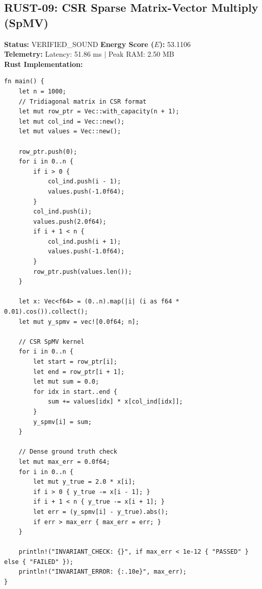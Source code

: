 \documentclass[11pt, a4paper]{article}
\begin{document}
\subsection{RUST-09: CSR Sparse Matrix-Vector Multiply (SpMV)}
\textbf{Status:} VERIFIED\_SOUND \hfill \textbf{Energy Score ($E$):} 53.1106\\
\textbf{Telemetry:} Latency: 51.86 ms $|$ Peak RAM: 2.50 MB\\
\textbf{Rust Implementation:}
\begin{verbatim}
fn main() {
    let n = 1000;
    // Tridiagonal matrix in CSR format
    let mut row_ptr = Vec::with_capacity(n + 1);
    let mut col_ind = Vec::new();
    let mut values = Vec::new();

    row_ptr.push(0);
    for i in 0..n {
        if i > 0 {
            col_ind.push(i - 1);
            values.push(-1.0f64);
        }
        col_ind.push(i);
        values.push(2.0f64);
        if i + 1 < n {
            col_ind.push(i + 1);
            values.push(-1.0f64);
        }
        row_ptr.push(values.len());
    }

    let x: Vec<f64> = (0..n).map(|i| (i as f64 * 0.01).cos()).collect();
    let mut y_spmv = vec![0.0f64; n];

    // CSR SpMV kernel
    for i in 0..n {
        let start = row_ptr[i];
        let end = row_ptr[i + 1];
        let mut sum = 0.0;
        for idx in start..end {
            sum += values[idx] * x[col_ind[idx]];
        }
        y_spmv[i] = sum;
    }

    // Dense ground truth check
    let mut max_err = 0.0f64;
    for i in 0..n {
        let mut y_true = 2.0 * x[i];
        if i > 0 { y_true -= x[i - 1]; }
        if i + 1 < n { y_true -= x[i + 1]; }
        let err = (y_spmv[i] - y_true).abs();
        if err > max_err { max_err = err; }
    }

    println!("INVARIANT_CHECK: {}", if max_err < 1e-12 { "PASSED" } else { "FAILED" });
    println!("INVARIANT_ERROR: {:.10e}", max_err);
}
\end{verbatim}
\end{document}
